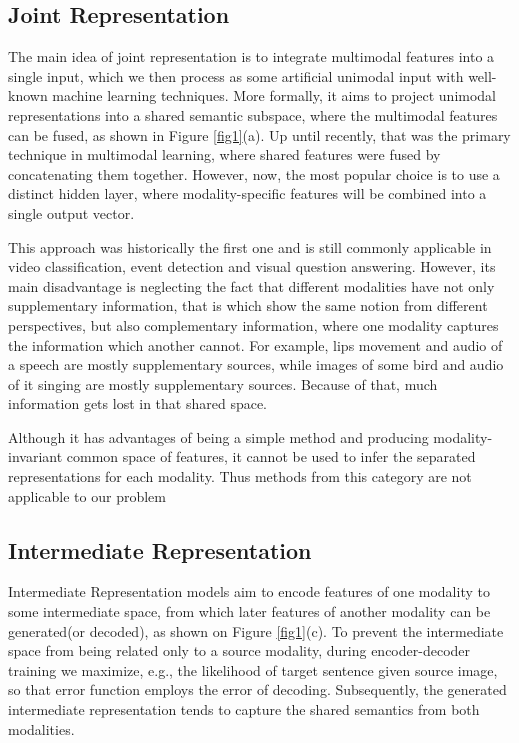\documentclass[runningheads]{llncs}
\begin{document}
\subsection{Joint Representation}
The main idea of joint representation is to integrate multimodal features into a single input, which we then process as some artificial unimodal input with well-known machine learning techniques. More formally, it aims to project unimodal representations into a shared semantic subspace, where the multimodal features can be fused\cite{ref_survey_baltrusaitis},  as shown in Figure \ref{fig1}(a). Up until recently, that was the primary technique in multimodal learning, where shared features were fused by concatenating them together. However, now,  the most popular choice is to use a distinct hidden layer, where modality-specific features will be combined into a single output vector.

This approach was historically the first one and is still commonly applicable in video classification\cite{ref_video_class}, event detection\cite{ref_event_detection} and visual question answering\cite{ref_visual_question_answ}. However, its main disadvantage is neglecting the fact that different modalities have not only supplementary information, that is which show the same notion from different perspectives, but also complementary information, where one modality captures the information which another cannot. For example, lips movement and audio of a speech are mostly supplementary sources, while images of some bird and audio of it singing are mostly supplementary sources. Because of that, much information gets lost in that shared space. 

Although it has advantages of being a simple method and producing modality-invariant common space of features, it cannot be used to infer the separated representations for each modality\cite{ref_survey}. Thus methods from this category are not applicable to our problem

\subsection{Intermediate Representation}
Intermediate Representation models aim to encode features of one modality to some intermediate space, from which later features of another modality can be generated(or decoded), as shown on Figure \ref{fig1}(c). To prevent the intermediate space from being related only to a source modality, during encoder-decoder training we maximize, e.g., the likelihood of target sentence given source image, so that error function employs the error of decoding. Subsequently, the generated intermediate representation tends to capture the shared semantics from both modalities\cite{ref_survey}. 
\end{document}
